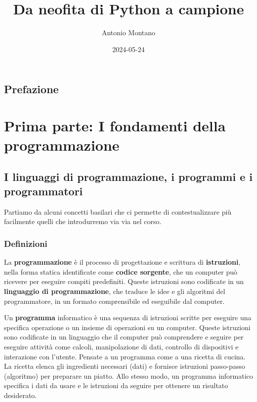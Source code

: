 \documentclass[
  letterpaper,
]{scrbook}
\title{Da neofita di Python a campione}
\author{Antonio Montano}
\date{2024-05-24}
\renewcommand*\contentsname{Indice}
\newcommand\contentsname{Indice}
\begin{document}
\frontmatter
\maketitle

\renewcommand*\contentsname{Indice}
{
\setcounter{tocdepth}{2}
\tableofcontents
}
\mainmatter
{}

\chapter*{Prefazione}\label{prefazione}


\part{Prima parte: I fondamenti della programmazione}

\chapter{I linguaggi di programmazione, i programmi e i
programmatori}\label{i-linguaggi-di-programmazione-i-programmi-e-i-programmatori}

Partiamo da alcuni concetti basilari che ci permette di contestualizzare
più facilmente quelli che introdurremo via via nel corso.

\section{Definizioni}\label{definizioni}

La \textbf{programmazione} è il processo di progettazione e scrittura di
\textbf{istruzioni}, nella forma statica identificate come
\textbf{codice sorgente}, che un computer può ricevere per eseguire
compiti predefiniti. Queste istruzioni sono codificate in un
\textbf{linguaggio di programmazione}, che traduce le idee e gli
algoritmi del programmatore, in un formato comprensibile ed eseguibile
dal computer.

Un \textbf{programma} informatico è una sequenza di istruzioni scritte
per eseguire una specifica operazione o un insieme di operazioni su un
computer. Queste istruzioni sono codificate in un linguaggio che il
computer può comprendere e seguire per eseguire attività come calcoli,
manipolazione di dati, controllo di dispositivi e interazione con
l'utente. Pensate a un programma come a una ricetta di cucina. La
ricetta elenca gli ingredienti necessari (dati) e fornisce istruzioni
passo-passo (algoritmo) per preparare un piatto. Allo stesso modo, un
programma informatico specifica i dati da usare e le istruzioni da
seguire per ottenere un risultato desiderato.
\end{document}
